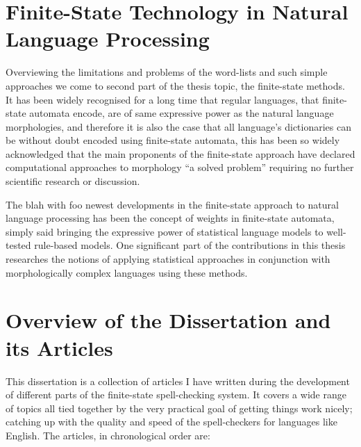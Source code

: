 \documentclass[officiallayout,draft]{unihelcompling}
\begin{document}
\section{Finite-State Technology in Natural Language Processing}
\label{sec:finite-state-technology-in-nlp}

Overviewing the limitations and problems of the word-lists and such simple
approaches we come to second part of the thesis topic, the finite-state methods.
It has been widely recognised for a long time that regular languages, that
finite-state automata encode, are of same expressive power as the natural
language morphologies, and therefore it is also the case that all language's
dictionaries can be without doubt encoded using finite-state automata, this has
been so widely acknowledged that the main proponents of the finite-state
approach have declared computational approaches to morphology ``a solved
problem'' requiring no further scientific research or discussion.

The blah with foo newest developments in the finite-state approach to natural
language processing has been the concept of weights in finite-state automata,
simply said bringing the expressive power of statistical language models to
well-tested rule-based models. One significant part of the contributions in
this thesis researches the notions of applying statistical approaches in
conjunction with morphologically complex languages using these 
methods.

\section{Overview of the Dissertation and its Articles}
\label{sec:articles}

This dissertation is a collection of articles I have written during the
development of different parts of the finite-state spell-checking system. It
covers a wide range of topics all tied together by the very practical goal of
getting things work nicely; catching up with the quality and speed of the
spell-checkers for languages like English. The articles, in chronological order
are:
\end{document}
